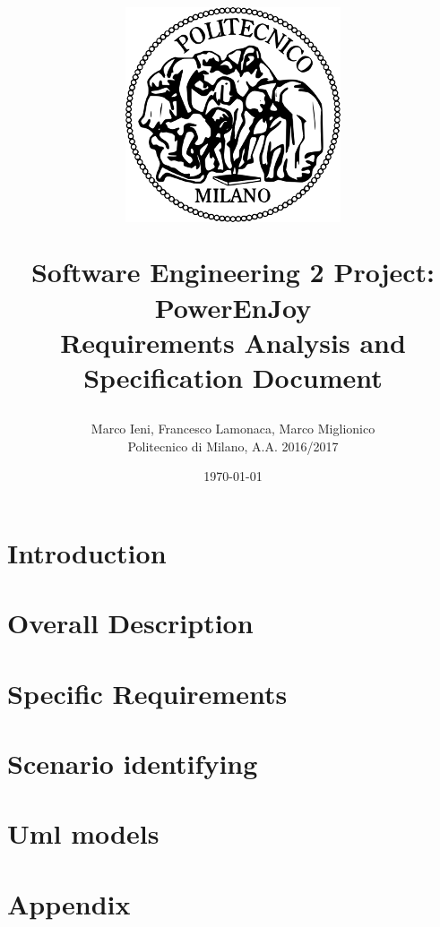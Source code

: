 \documentclass[a4paper, 12pt]{report}
\title{
	\begin{figure}[h]
		\centering
		\includegraphics{../common_resources/logo_polimi.png}
	\end{figure}
	\vspace{30px}
	Software Engineering 2 Project: PowerEnJoy \\ \vspace{1em}
	\textbf{R}equirements \textbf{A}nalysis and \textbf{S}pecification \textbf{D}ocument
}
\author{Marco Ieni, Francesco Lamonaca, Marco Miglionico\\Politecnico di Milano, A.A. 2016/2017}
\date{\today}
\begin{document}
\maketitle
\tableofcontents

\chapter{Introduction}
\label{ch:introduction}












\chapter{Overall Description}
\label{ch:overall_description}







\chapter{Specific Requirements}
\label{ch:specific_requirements}


% 


\chapter{Scenario identifying}


\chapter{Uml models}




\appendix
\chapter{Appendix}

\end{document}
